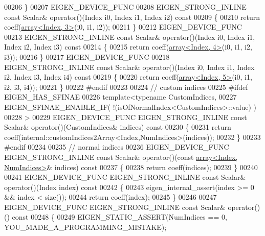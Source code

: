 \begin{DoxyCode}
00206     \}
00207     EIGEN\_DEVICE\_FUNC
00208     EIGEN\_STRONG\_INLINE \textcolor{keyword}{const} Scalar& operator()(Index i0, Index i1, Index i2)\textcolor{keyword}{ const}
00209 \textcolor{keyword}{    }\{
00210       \textcolor{keywordflow}{return} coeff(\hyperlink{class_eigen_1_1array}{array<Index, 3>}(i0, i1, i2));
00211     \}
00212     EIGEN\_DEVICE\_FUNC
00213     EIGEN\_STRONG\_INLINE \textcolor{keyword}{const} Scalar& operator()(Index i0, Index i1, Index i2, Index i3)\textcolor{keyword}{ const}
00214 \textcolor{keyword}{    }\{
00215       \textcolor{keywordflow}{return} coeff(\hyperlink{class_eigen_1_1array}{array<Index, 4>}(i0, i1, i2, i3));
00216     \}
00217     EIGEN\_DEVICE\_FUNC
00218     EIGEN\_STRONG\_INLINE \textcolor{keyword}{const} Scalar& operator()(Index i0, Index i1, Index i2, Index i3, Index i4)\textcolor{keyword}{ const}
00219 \textcolor{keyword}{    }\{
00220       \textcolor{keywordflow}{return} coeff(\hyperlink{class_eigen_1_1array}{array<Index, 5>}(i0, i1, i2, i3, i4));
00221     \}
00222 \textcolor{preprocessor}{#endif}
00223 
00224     \textcolor{comment}{// custom indices}
00225 \textcolor{preprocessor}{#ifdef EIGEN\_HAS\_SFINAE}
00226     \textcolor{keyword}{template}<\textcolor{keyword}{typename} CustomIndices,
00227              EIGEN\_SFINAE\_ENABLE\_IF( !(isOfNormalIndex<CustomIndices>::value) )
00228     >
00229     EIGEN\_DEVICE\_FUNC EIGEN\_STRONG\_INLINE \textcolor{keyword}{const} Scalar& operator()(CustomIndices& indices)\textcolor{keyword}{ const}
00230 \textcolor{keyword}{    }\{
00231         \textcolor{keywordflow}{return} coeff(internal::customIndices2Array<Index,NumIndices>(indices));
00232     \}
00233 \textcolor{preprocessor}{#endif}
00234 
00235     \textcolor{comment}{// normal indices}
00236     EIGEN\_DEVICE\_FUNC EIGEN\_STRONG\_INLINE \textcolor{keyword}{const} Scalar& operator()(\textcolor{keyword}{const} 
      \hyperlink{class_eigen_1_1array}{array<Index, NumIndices>}& indices)\textcolor{keyword}{ const}
00237 \textcolor{keyword}{    }\{
00238       \textcolor{keywordflow}{return} coeff(indices);
00239     \}
00240 
00241     EIGEN\_DEVICE\_FUNC EIGEN\_STRONG\_INLINE \textcolor{keyword}{const} Scalar& operator()(Index index)\textcolor{keyword}{ const}
00242 \textcolor{keyword}{    }\{
00243       eigen\_internal\_assert(index >= 0 && index < size());
00244       \textcolor{keywordflow}{return} coeff(index);
00245     \}
00246 
00247     EIGEN\_DEVICE\_FUNC EIGEN\_STRONG\_INLINE \textcolor{keyword}{const} Scalar& operator()()\textcolor{keyword}{ const}
00248 \textcolor{keyword}{    }\{
00249       EIGEN\_STATIC\_ASSERT(NumIndices == 0, YOU\_MADE\_A\_PROGRAMMING\_MISTAKE);

\end{DoxyCode}
